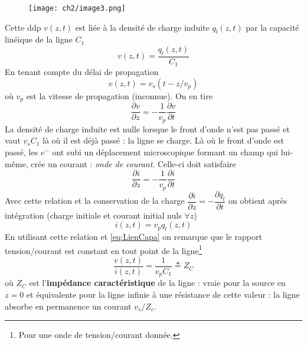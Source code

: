 \begin{figure}
	\texttt{[image: ch2/image3.png]}
\end{figure}
Cette ddp $v(z,t)$ est liée à la densité de charge induite $q_l(z,t)$ par la capacité linéique de 
la ligne $C_1$
\begin{equation}
v(z,t) = \dfrac{q_l(z,t)}{C_1}
\label{eq:LienCapa}
\end{equation}
En tenant compte du délai de propagation
\begin{equation}
v(z,t) = v_s(t-z/v_p)
\end{equation}
où $v_p$ est la vitesse de propagation (inconnue). On en tire
\begin{equation}
\dfrac{\partial v}{\partial z} = -\dfrac{1}{v_p}\dfrac{\partial v}{\partial t}
\label{eq:ASat}
\end{equation}
La densité de charge induite est nulle lorsque 
le front d'onde n'est pas passé et vaut $v_sC_1$ là où il est déjà passé : la ligne se charge. Là 
où le front d'onde est passé, les $e^-$ ont subi un déplacement microscopique formant un champ qui 
lui-même, crée un courant : \textit{onde de courant}. Celle-ci doit satisfaire
\begin{equation}
\dfrac{\partial i}{\partial z} = -\dfrac{1}{v_p}\dfrac{\partial i}{\partial t}
\end{equation}
Avec cette relation et la conservation de la charge $\displaystyle\dfrac{\partial i}{\partial z} 
=-\dfrac{\partial q_l}{\partial t}$ on obtient après intégration (charge initiale et courant 
initial nuls $\forall z$)
\begin{equation}
i(z,t) = v_pq_l(z,t)
\end{equation}
En utilisant cette relation et \autoref{eq:LienCapa} on remarque que le rapport tension/courant 
est constant en tout point de la ligne\footnote{Pour une onde de tension/courant donnée.}
\begin{equation}
\dfrac{v(z,t)}{i(z,t)} = \dfrac{1}{v_pC_1}\triangleq Z_C
\label{eq:DefZC}
\end{equation}
où $Z_C$ est l'\textbf{impédance caractéristique} de la ligne : vraie pour la source en $z=0$ et 
équivalente pour la ligne infinie à une résistance de cette valeur : la ligne absorbe en 
permanence un courant $v_s/Z_c$.


